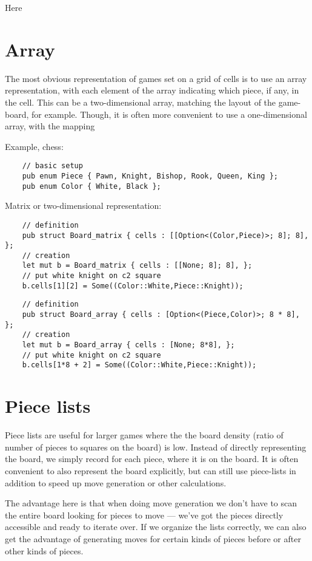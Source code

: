 \documentclass[10pt,dvipdfmx,letterpaper]{report}
\begin{document}
Here 

\section{Array}

The most obvious representation of games set on a grid of cells is to use an array
representation, with each element of the array indicating which piece, if any, in the cell.
This can be a two-dimensional array, matching the layout of the game-board, for example.
Though, it is often more convenient to use a one-dimensional array, with the mapping

Example, chess:
{\scriptsize\begin{verbatim}
    // basic setup
    pub enum Piece { Pawn, Knight, Bishop, Rook, Queen, King };
    pub enum Color { White, Black };
\end{verbatim}}
Matrix or two-dimensional representation:
{\scriptsize\begin{verbatim}
    // definition
    pub struct Board_matrix { cells : [[Option<(Color,Piece)>; 8]; 8], };
    // creation
    let mut b = Board_matrix { cells : [[None; 8]; 8], };
    // put white knight on c2 square
    b.cells[1][2] = Some((Color::White,Piece::Knight));
\end{verbatim}}
{\scriptsize\begin{verbatim}
    // definition
    pub struct Board_array { cells : [Option<(Piece,Color)>; 8 * 8], };
    // creation
    let mut b = Board_array { cells : [None; 8*8], };
    // put white knight on c2 square
    b.cells[1*8 + 2] = Some((Color::White,Piece::Knight));
\end{verbatim}}

\section{Piece lists}

Piece lists are useful for larger games where the the board density
(ratio of number of pieces to squares on the board) is low.  Instead of
directly representing the board, we simply record for each piece, where
it is on the board.  It is often convenient to also represent the board
explicitly, but can still use piece-lists in addition to speed up move generation
or other calculations.

The advantage here is that when doing move generation we don't have to scan the entire board
looking for pieces to move --- we've got the pieces directly accessible and ready to iterate over.
If we organize the lists correctly, we can also get the advantage of generating moves for certain
kinds of pieces before or after other kinds of pieces.
\end{document}

